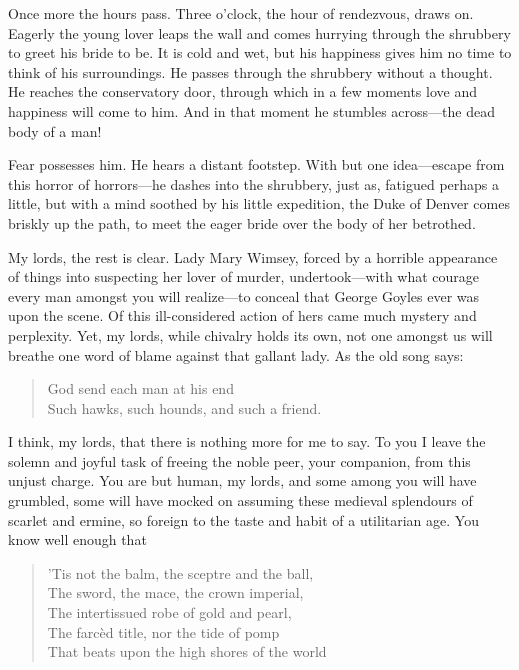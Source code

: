 \begin{dialogue}
\smallskip

Once more the hours pass. Three o'clock, the hour of rendezvous, draws on. Eagerly the young lover leaps the wall and comes hurrying through the shrubbery to greet his bride to be. It is cold and wet, but his happiness gives him no time to think of his surroundings. He passes through the shrubbery without a thought. He reaches the conservatory door, through which in a few moments love and happiness will come to him. And in that moment he stumbles across\allowbreak---\allowbreak the dead body of a man!

\smallskip

Fear possesses him. He hears a distant footstep. With but one idea\allowbreak---\allowbreak escape from this horror of horrors\allowbreak---\allowbreak he dashes into the shrubbery, just as, fatigued perhaps a little, but with a mind soothed by his little expedition, the Duke of Denver comes briskly up the path, to meet the eager bride over the body of her betrothed.

\smallskip

My lords, the rest is clear. Lady Mary Wimsey, forced by a horrible appearance of things into suspecting her lover of murder, undertook\allowbreak---\allowbreak with what courage every man amongst you will realize\allowbreak---\allowbreak to conceal that George Goyles ever was upon the scene. Of this ill-considered action of hers came much mystery and perplexity. Yet, my lords, while chivalry holds its own, not one amongst us will breathe one word of blame against that gallant lady. As the old song says:

\begin{verse}
God send each man at his end\\
Such hawks, such hounds, and such a friend.\\
\end{verse}


I think, my lords, that there is nothing more for me to say. To you I leave the solemn and joyful task of freeing the noble peer, your companion, from this unjust charge. You are but human, my lords, and some among you will have grumbled, some will have mocked on assuming these medieval splendours of scarlet and ermine, so foreign to the taste and habit of a utilitarian age. You know well enough that

\begin{verse}
'Tis not the balm, the sceptre and the ball,\\
The sword, the mace, the crown imperial,\\
The intertissued robe of gold and pearl,\\
The farcèd title, nor the tide of pomp\\
That beats upon the high shores of the world\\
\end{verse}


\end{dialogue}
